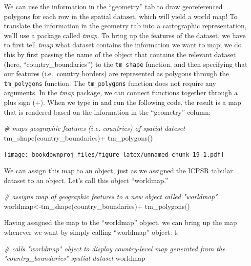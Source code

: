 \documentclass[
]{article}
\newenvironment{Shaded}{\begin{snugshade}}{\end{snugshade}}
\newcommand{\CommentTok}[1]{\textcolor[rgb]{0.56,0.35,0.01}{\textit{#1}}}
\newcommand{\FunctionTok}[1]{\textcolor[rgb]{0.00,0.00,0.00}{#1}}
\newcommand{\NormalTok}[1]{#1}
\newcommand{\OtherTok}[1]{\textcolor[rgb]{0.56,0.35,0.01}{#1}}
\newcommand{\SpecialCharTok}[1]{\textcolor[rgb]{0.00,0.00,0.00}{#1}}
\begin{document}
We can use the information in the ``geometry'' tab to draw georeferenced polygons for each row in the spatial dataset, which will yield a world map! To translate the information in the geometry tab into a cartographic representation, we'll use a package called \emph{tmap}. To bring up the features of the dataset, we have to first tell \emph{tmap} what dataset contains the information we want to map; we do this by first passing the name of the object that contains the relevant dataset (here, ``country\_boundaries'') to the \texttt{tm\_shape} function, and then specifying that our features (i.e.~country borders) are represented as polygons through the \texttt{tm\_polygons} function. The \texttt{tm\_polygons} function does not require any arguments. In the \emph{tmap} package, we can connect functions together through a plus sign (+). When we type in and run the following code, the result is a map that is rendered based on the information in the ``geometry'' column:

\begin{Shaded}
\begin{Highlighting}[]
\CommentTok{\# maps geographic features (i.e. countries) of spatial dateset}
\FunctionTok{tm\_shape}\NormalTok{(country\_boundaries)}\SpecialCharTok{+}
  \FunctionTok{tm\_polygons}\NormalTok{()}
\end{Highlighting}
\end{Shaded}

\texttt{[image: bookdownproj\_files/figure-latex/unnamed-chunk-19-1.pdf]}

We can assign this map to an object, just as we assigned the ICPSR tabular dataset to an object. Let's call this object ``worldmap.''

\begin{Shaded}
\begin{Highlighting}[]
\CommentTok{\# assigns map of geographic features to a new object called "worldmap" }
\NormalTok{worldmap}\OtherTok{\textless{}{-}}\FunctionTok{tm\_shape}\NormalTok{(country\_boundaries)}\SpecialCharTok{+}
            \FunctionTok{tm\_polygons}\NormalTok{()}
\end{Highlighting}
\end{Shaded}

Having assigned the map to the ``worldmap'' object, we can bring up the map whenever we want by simply calling ``worldmap'' object: t:

\begin{Shaded}
\begin{Highlighting}[]
\CommentTok{\# calls "worldmap" object to display country{-}level map generated from the "country\_boundaries" spatial dataset }
\NormalTok{worldmap}
\end{Highlighting}
\end{Shaded}
\end{document}
